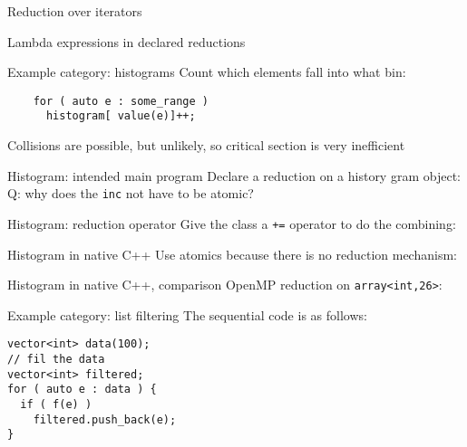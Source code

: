 \documentclass[11pt,headernav]{beamer}
\begin{document}
\begin{numberedframe}{Reduction over iterators}
  
\end{numberedframe}

\begin{numberedframe}{Lambda expressions in declared reductions}
  
\end{numberedframe}


\begin{numberedframe}{Example category: histograms}
  Count which elements fall into what bin:
  \begin{lstlisting}
    for ( auto e : some_range )
      histogram[ value(e)]++;
  \end{lstlisting}
  Collisions are possible, but unlikely, so critical section is very inefficient
\end{numberedframe}

\begin{numberedframe}{Histogram: intended main program}
  Declare a reduction on a history gram object:
  Q: why does the \lstinline{inc} not have to be atomic?
\end{numberedframe}

\begin{numberedframe}{Histogram: reduction operator}
  Give the class a \lstinline{+=} operator to do the combining:
  \footnotesize
\end{numberedframe}

\begin{numberedframe}{Histogram in native C++}
  Use atomics because there is no reduction mechanism:
\end{numberedframe}

\begin{numberedframe}{Histogram in native C++, comparison}
  OpenMP reduction on \lstinline{array<int,26>}:
  \footnotesize
  
\end{numberedframe}

\begin{numberedframe}{Example category: list filtering}
The sequential code is as follows:
\begin{lstlisting}
vector<int> data(100);
// fil the data
vector<int> filtered;
for ( auto e : data ) {
  if ( f(e) )
    filtered.push_back(e);
}
\end{lstlisting}
\end{numberedframe}
\end{document}
